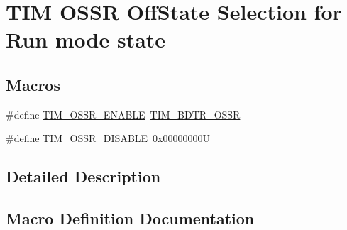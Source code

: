 \hypertarget{group___t_i_m___o_s_s_r___off___state___selection__for___run__mode__state}{}\section{T\+IM O\+S\+SR Off\+State Selection for Run mode state}
\label{group___t_i_m___o_s_s_r___off___state___selection__for___run__mode__state}
\subsection*{Macros}
\begin{DoxyCompactItemize}
\item 
\#define \hyperlink{group___t_i_m___o_s_s_r___off___state___selection__for___run__mode__state_ga5d21918f173eca946748a1fbc177daa5}{T\+I\+M\+\_\+\+O\+S\+S\+R\+\_\+\+E\+N\+A\+B\+LE}~\hyperlink{group___peripheral___registers___bits___definition_gaf9435f36d53c6be1107e57ab6a82c16e}{T\+I\+M\+\_\+\+B\+D\+T\+R\+\_\+\+O\+S\+SR}
\item 
\#define \hyperlink{group___t_i_m___o_s_s_r___off___state___selection__for___run__mode__state_gae11820b467ef6d74c90190c8cfce5e73}{T\+I\+M\+\_\+\+O\+S\+S\+R\+\_\+\+D\+I\+S\+A\+B\+LE}~0x00000000U
\end{DoxyCompactItemize}


\subsection{Detailed Description}


\subsection{Macro Definition Documentation}
\mbox{\label{group___t_i_m___o_s_s_r___off___state___selection__for___run__mode__state_gae11820b467ef6d74c90190c8cfce5e73}} 
